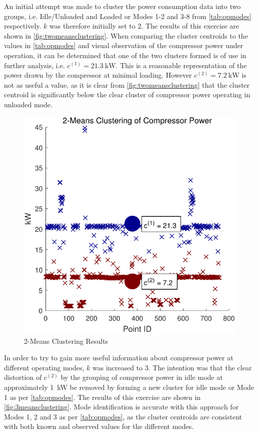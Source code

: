 An initial attempt was made to cluster the power consumption data into two groups, i.e. Idle/Unloaded and Loaded or Modes 1-2 and 3-8 from \autoref{tab:opmodes} respectively. $k$ was therefore initially set to 2. The results of this exercise are shown in \autoref{fig:twomeansclustering}. When comparing the cluster centroids to the values in \autoref{tab:opmodes} and visual observation of the compressor power under operation, it can be determined that one of the two clusters formed is of use in further analysis, i.e. $c^{(1)} = \SI{21.3}{\kilo \watt}.$ This is a reasonable representation of the power drawn by the compressor at minimal loading. However $c^{(2)} = \SI{7.2}{\kilo \watt}$ is not as useful a value, as it is clear from \autoref{fig:twomeansclustering} that the cluster centroid is significantly below the clear cluster of compressor power operating in unloaded mode.

\begin{figure}
\includegraphics[width = .5\columnwidth]{./Images/2MeansClustering.pdf}
\caption{2-Means Clustering Results}
\label{fig:twomeansclustering}
\end{figure}

In order to try to gain more useful information about compressor power at different operating modes, $k$ was increased to 3. The intention was that the clear distortion of $c^{(2)}$ by the grouping of compressor power in idle mode at approximately \SI{1}{\kilo \watt} be removed by forming a new cluster for idle mode or Mode 1 as per \autoref{tab:opmodes}. The results of this exercise are shown in \autoref{fig:3meansclustering}. Mode identification is accurate with this approach for Modes 1, 2 and 3 as per \autoref{tab:opmodes}, as the cluster centroids are consistent with both known and observed values for the different modes.


